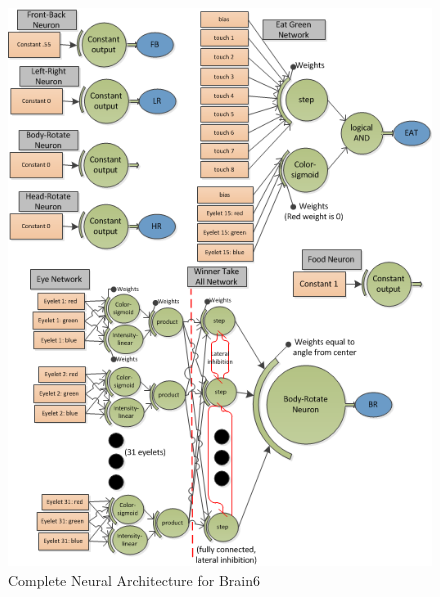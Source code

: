 \documentclass[a4paper,11pt]{article}
\begin{document}
\begin{figure}
\begin{center}
  \includegraphics[scale=1.0]{img/brain6complete.png}
  \caption{Complete Neural Architecture for Brain6 }
  \label{fig:brain6complete}
\end{center}
\end{figure}
\end{document}
